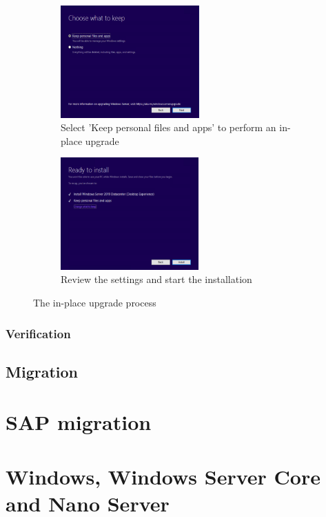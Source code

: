 \begin{figure}[h]\ContinuedFloat
	\begin{subfigure}{0.5\textwidth}
		\captionsetup{width=0.8\linewidth}
		\includegraphics[width=0.9\linewidth,height=4.3cm]{img/In-Place_WS_6.png} 
		\centering
		\caption{Select 'Keep personal files and apps' to perform an in-place upgrade}
		\label{fig:inplace6}
	\end{subfigure}
	\begin{subfigure}{0.5\textwidth}
		\captionsetup{width=0.8\linewidth}
		\includegraphics[width=0.9\linewidth,height=4.3cm]{img/In-Place_WS_7.png}
		\centering
		\caption{Review the settings and start the installation}
		\label{fig:inplace7}
	\end{subfigure}
	\caption{The in-place upgrade process}
	\label{fig:inplace}
\end{figure}
\subsubsection{Verification}
\subsection{Migration}
\section{SAP migration}
\section{Windows, Windows Server Core and Nano Server}